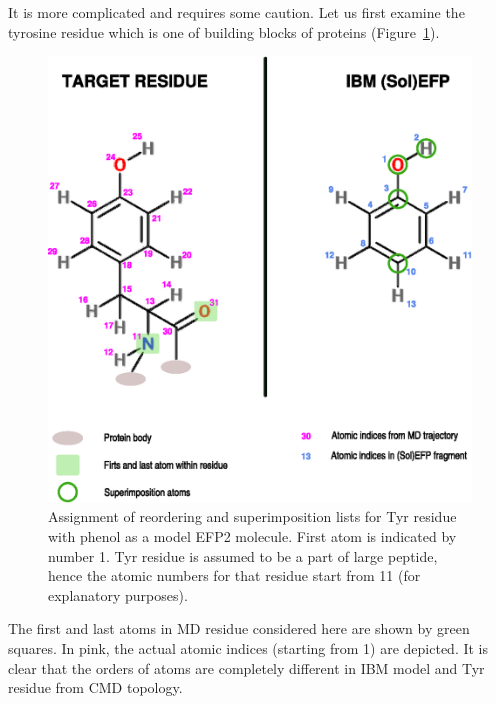 \documentclass[b5paper,oneside,fleqn,11pt]{book}
\begin{document}
\begin{refsection}
It is more complicated and requires some caution. 
Let us first examine the tyrosine residue which is one of
building blocks of proteins (Figure~\ref{f:tyr-res-lists}).
%
\begin{figure}[t!]
\centering
\setlength\fboxsep{0.4pt}
\setlength\fboxrule{0.5pt}
\includegraphics[width=0.92\linewidth]{m.reorder.eps}
\caption{
Assignment of reordering and superimposition lists for Tyr residue
with phenol as a model EFP2 molecule. First atom is indicated by
number 1.
Tyr residue is assumed to be
a part of large peptide, hence the atomic numbers for that residue start
from 11 (for explanatory purposes).
\label{f:tyr-res-lists}}
\end{figure}
%
The first and last atoms in MD residue considered here are shown by green squares. In pink, the actual
atomic indices (starting from 1) are depicted. It is clear that the orders 
of atoms are completely different in IBM model and Tyr residue from CMD topology.


\end{refsection}
\end{document}
